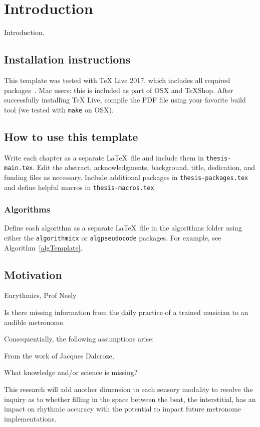 
\chapter{Introduction} \label{secIntro}

Introduction.

\section{Installation instructions}

This template was tested with TeX Live 2017, which includes all required packages~\cite{TUG2017}. Mac users: this is included as part of OSX and TeXShop. After successfully installing TeX Live, compile the PDF file using your favorite build tool (we tested with \verb!make! on OSX).

\section{How to use this template}
Write each chapter as a separate \LaTeX\ file and include them in \verb!thesis-main.tex!. Edit the abstract, acknowledgments, background, title, dedication, and funding files as necessary. Include additional packages in \verb!thesis-packages.tex! and define helpful macros in \verb!thesis-macros.tex!.

\subsection{Algorithms}
Define each algorithm as a separate \LaTeX\ file in the algorithms folder using either the \verb!algorithmicx! or \verb!algpseudocode! packages. For example, see Algorithm~\ref{algTemplate}.





\section{Motivation}

Eurythmics, Prof Neely

Is there missing information from the daily practice of a trained musician to an audible metronome. 

Consequentially, the following assumptions arise:


From the work of Jacques Dalcroze, 

What knowledge and/or science is missing?

This research will add another dimension to each sensory modality to resolve the inquiry as to whether filling in the space between the beat, the interstitial, has an impact on rhythmic accuracy with the potential to impact future metronome implementations. 


